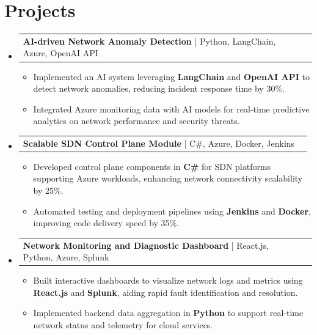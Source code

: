 \documentclass[letterpaper,11pt]{article}
\makeatletter
\newcommand{\resumeItem}[1]{
  \item\footnotesize{
    {#1 \vspace{-2pt}}
  }
}
\newcommand{\resumeProjectHeading}[2]{
    \item
    \begin{tabular*}{1.001\textwidth}{l@{\extracolsep{\fill}}r}
      \small#1 & \textbf{\small #2}\\
    \end{tabular*}\vspace{-7pt}
}
\newcommand{\resumeSubHeadingListStart}{\begin{itemize}[leftmargin=0pt, label={}]}
\newcommand{\resumeSubHeadingListEnd}{\end{itemize}}
\newcommand{\resumeItemListStart}{\begin{itemize}[leftmargin=*]}
\newcommand{\resumeItemListEnd}{\end{itemize}\vspace{-5pt}}
\makeatother
\begin{document}
\section{Projects}
    \vspace{-5pt}
    \resumeSubHeadingListStart
          \resumeProjectHeading
              {\textbf{AI-driven Network Anomaly Detection} | Python, LangChain, Azure, OpenAI API}{}
        \resumeItemListStart
            \resumeItem{Implemented an AI system leveraging \textbf{LangChain} and \textbf{OpenAI API} to detect network anomalies, reducing incident response time by 30\%.}
            \resumeItem{Integrated Azure monitoring data with AI models for real-time predictive analytics on network performance and security threats.}
        \resumeItemListEnd
        \vspace{-12pt}
    
    \resumeProjectHeading
        {\textbf{Scalable SDN Control Plane Module} | C\#, Azure, Docker, Jenkins}{}
        \resumeItemListStart
            \resumeItem{Developed control plane components in \textbf{C\#} for SDN platforms supporting Azure workloads, enhancing network connectivity scalability by 25\%.}
            \resumeItem{Automated testing and deployment pipelines using \textbf{Jenkins} and \textbf{Docker}, improving code delivery speed by 35\%.}
        \resumeItemListEnd
          \vspace{-12pt}
      \resumeProjectHeading
          {\textbf{Network Monitoring and Diagnostic Dashboard} | React.js, Python, Azure, Splunk}{}
          \resumeItemListStart
              \resumeItem{Built interactive dashboards to visualize network logs and metrics using \textbf{React.js} and \textbf{Splunk}, aiding rapid fault identification and resolution.}
              \resumeItem{Implemented backend data aggregation in \textbf{Python} to support real-time network status and telemetry for cloud services.}
          \resumeItemListEnd 
    \resumeSubHeadingListEnd
\end{document}
